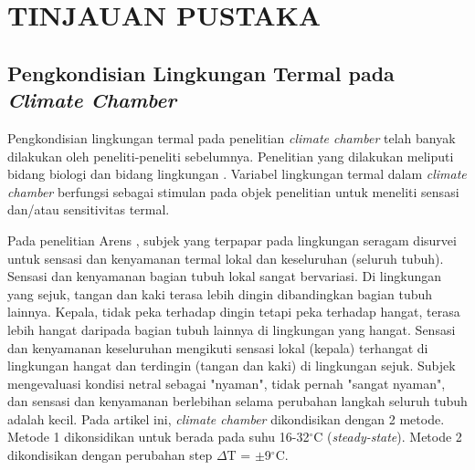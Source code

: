 \chapter{TINJAUAN PUSTAKA}
\label{pustaka}

\section{Pengkondisian Lingkungan Termal pada \textit{Climate Chamber}}

Pengkondisian lingkungan termal pada penelitian \textit{climate chamber} telah banyak dilakukan oleh peneliti-peneliti sebelumnya. Penelitian yang dilakukan meliputi bidang biologi \cite{paper21Arens, paper21JYLee} dan bidang lingkungan \cite{paper21Veronica}. Variabel lingkungan termal dalam \textit{climate chamber} berfungsi sebagai stimulan pada objek penelitian untuk meneliti sensasi dan/atau sensitivitas termal.

Pada penelitian Arens \cite{paper21Arens}, subjek yang terpapar pada lingkungan seragam disurvei untuk sensasi dan kenyamanan termal lokal dan keseluruhan (seluruh tubuh). Sensasi dan kenyamanan bagian tubuh lokal sangat bervariasi. Di lingkungan yang sejuk, tangan dan kaki terasa lebih dingin dibandingkan bagian tubuh lainnya. Kepala, tidak peka terhadap dingin tetapi peka terhadap hangat, terasa lebih hangat daripada bagian tubuh lainnya di lingkungan yang hangat. Sensasi dan kenyamanan keseluruhan mengikuti sensasi lokal (kepala) terhangat di lingkungan hangat dan terdingin (tangan dan kaki) di lingkungan sejuk. Subjek mengevaluasi kondisi netral sebagai "nyaman", tidak pernah "sangat nyaman", dan sensasi dan kenyamanan berlebihan selama perubahan langkah seluruh tubuh adalah kecil. Pada artikel ini, \textit{climate chamber} dikondisikan dengan 2 metode. Metode 1 dikonsidikan untuk berada pada suhu 16-32$^\circ$C (\textit{steady-state}). Metode 2 dikondisikan dengan perubahan step $\Delta$T = $\pm$9$^\circ$C.

